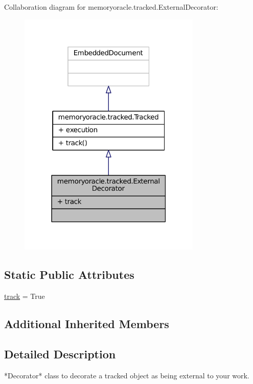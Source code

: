 Collaboration diagram for memoryoracle.\+tracked.\+External\+Decorator\+:
\nopagebreak
\begin{figure}[H]
\begin{center}
\leavevmode
\includegraphics[width=247pt]{classmemoryoracle_1_1tracked_1_1ExternalDecorator__coll__graph}
\end{center}
\end{figure}
\subsection*{Static Public Attributes}
\begin{DoxyCompactItemize}
\item 
\hyperlink{classmemoryoracle_1_1tracked_1_1ExternalDecorator_ab19a351b0611438256f7e65cbde9d301}{track} = True
\end{DoxyCompactItemize}
\subsection*{Additional Inherited Members}


\subsection{Detailed Description}
\begin{DoxyVerb}*Decorator* class to decorate a tracked object as being external
to your work.
\end{DoxyVerb}
 

